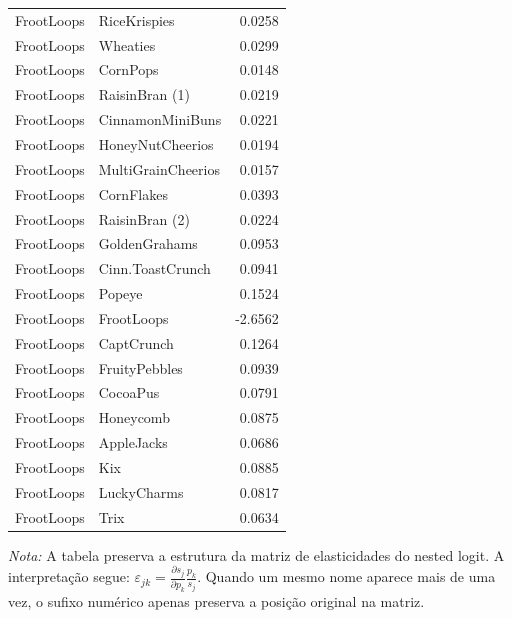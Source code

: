 \begin{table}[H]
\begin{tabular}{llr}
FrootLoops & RiceKrispies & 0.0258 \\
FrootLoops & Wheaties & 0.0299 \\
FrootLoops & CornPops & 0.0148 \\
FrootLoops & RaisinBran (1) & 0.0219 \\
FrootLoops & CinnamonMiniBuns & 0.0221 \\
FrootLoops & HoneyNutCheerios & 0.0194 \\
FrootLoops & MultiGrainCheerios & 0.0157 \\
FrootLoops & CornFlakes & 0.0393 \\
FrootLoops & RaisinBran (2) & 0.0224 \\
FrootLoops & GoldenGrahams & 0.0953 \\
FrootLoops & Cinn.ToastCrunch & 0.0941 \\
FrootLoops & Popeye & 0.1524 \\
FrootLoops & FrootLoops & -2.6562 \\
FrootLoops & CaptCrunch & 0.1264 \\
FrootLoops & FruityPebbles & 0.0939 \\
FrootLoops & CocoaPus & 0.0791 \\
FrootLoops & Honeycomb & 0.0875 \\
FrootLoops & AppleJacks & 0.0686 \\
FrootLoops & Kix & 0.0885 \\
FrootLoops & LuckyCharms & 0.0817 \\
FrootLoops & Trix & 0.0634 \\
\bottomrule
\end{tabular}

\vspace{0.3em}
\footnotesize
\textit{Nota:} A tabela preserva a estrutura da matriz de elasticidades do nested logit. A interpretação segue: $\varepsilon_{jk}=\frac{\partial s_j}{\partial p_k}\frac{p_k}{s_j}$. Quando um mesmo nome aparece mais de uma vez, o sufixo numérico apenas preserva a posição original na matriz.
\end{table}
\endgroup


